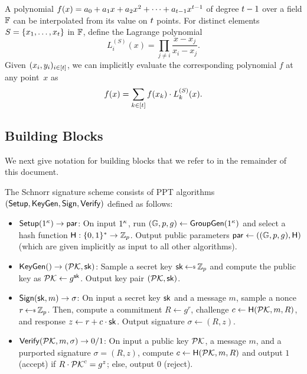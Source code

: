 \medskip{}
A polynomial $f(x) = a_0 + a_1 x + a_2 x^2 + \cdots + a_{t-1} x^{t-1}$
of degree $t-1$ over a field $\mathbb{F}$ can be interpolated from its value on $t$ points.
For  distinct elements~$S = \{x_1, \ldots, x_{t}\}$ in $\mathbb{F}$,
define the Lagrange polynomial
\begin{equation}\label{eqn:lagrange}
L_i^{(S)}(x) = \prod_{j \neq i } \frac{x-x_j}{x_i - x_j}.
\end{equation}
Given $(x_i, y_i)_{i \in [t]}$, we can implicitly evaluate the corresponding polynomial $f$ at any point~$x$ as
\[ f(x) = \sum_{k \in [t]} f(x_k) \cdot L^{(S)}_k(x). \]


\subsection{Building Blocks}

We next give notation for building blocks that we refer to in the remainder of
this document.

\begin{definition} \label{defn:schnorr}
The Schnorr signature scheme consists of PPT algorithms $(\mathsf{Setup}, \mathsf{KeyGen}, \mathsf{Sign}, \mathsf{Verify})$ defined as follows:

  \begin{itemize}[itemsep=1mm]

    \item $\mathsf{Setup}(1^\kappa) \rightarrow \mathsf{par}$:
    On input $1^\kappa$, run $(\mathbb{G}, p, g) \gets \mathsf{GroupGen}(1^{\kappa})$ and select a hash function $\mathsf{H}: \{0,1\}^* \rightarrow \mathbb{Z}_p$. Output public parameters $\mathsf{par} \gets ((\mathbb{G}, p, g), \mathsf{H})$ (which are given implicitly as input to all other algorithms).

  \item $\mathsf{KeyGen}() \rightarrow (\mathcal{PK}, \mathsf{sk})$:
  Sample a secret key $\sk \randpick \Zp$ and compute the public key as $\mathcal{PK} \gets g^{\mathsf{sk}}$.
    Output key pair $(\mathcal{PK}, \mathsf{sk})$.

  \item $\mathsf{Sign}(\mathsf{sk}, m) \rightarrow \sigma$:
    On input a secret key $\mathsf{sk}$ and a message $m$, sample a nonce $r \randpick \Zp$. Then, compute a
     commitment $R \gets g^r$,  challenge $c \gets \mathsf{H}(\mathcal{PK}, m, R)$, and
    response $z \gets r + c \cdot \mathsf{sk}$. Output signature $\sigma \gets (R,z)$.

  \item $\mathsf{Verify}(\mathcal{PK}, m, \sigma) \rightarrow 0/1$:
  On input a public key $\mathcal{PK}$,
    a message $m$, and a purported signature $\sigma = (R, z)$, compute $c
    \leftarrow \mathsf{H}(\mathcal{PK}, m, R)$ and output $1$ (accept) if $R \cdot \mathcal{PK}^c = g^z$; else, output $0$ (reject).

\end{itemize}
\end{definition}

